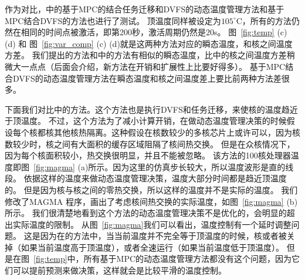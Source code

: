 作为对比，\cite{MaWang:APCCAS'14}中的基于MPC的结合任务迁移和DVFS的动态温度管理方法和基于MPC结合DVFS的方法也进行了测试。
顶温度同样被设定为$105^{\circ}$C，所有的方法仍然在相同的时间点被激活，即第200秒，激活周期仍然是$20$s。
图~\ref{fig:temp} (c) (d) 和 图~\ref{fig:var_comp} (c) (d)就是这两种方法对应的瞬态温度，和核之间温度方差。
我们提出的方法和\cite{MaWang:APCCAS'14}中的方法有相似的瞬态温度，比\cite{MaWang:APCCAS'14}中的核之间温度方差稍微大一点点（后面会介绍，新方法在开销和扩展性上比\cite{MaWang:APCCAS'14}要好得多）。
基于MPC结合DVFS的动态温度管理方法在瞬态温度和核之间温度差上要比前两种方法差很多。

下面我们对比\cite{Hanumaiah:TCAD'11}中的方法。这个方法也是执行DVFS和任务迁移，来使核的温度趋近于顶温度。
不过，这个方法为了减小计算开销，在做动态温度管理决策的时候假设每个核都核其他核热隔离。这种假设在核数较少的多核芯片上或许可以，因为核数较少时，核之间有大面积的缓存区域阻隔了核间热交换。
但是在众核情况下，因为每个核面积较小，热交换很明显，并且不能被忽略。
该方法的100核处理器温度即图~\ref{fig:magma} (a)所示。因为这里的仿真步长较大，所以温度波形是直的线段。
依据这样的温度来做动态温度管理决策，温度大部分时间都是趋近顶温度的。
但是因为核与核之间的零热交换，所以这样的温度并不是实际的温度。
我们修改了MAGMA 程序，画出了考虑核间热交换的实际温度，如图~\ref{fig:magma} (b)所示。
我们很清楚地看到这个方法的动态温度管理决策不是优化的，会明显的超出实际温度的限制。
从图~\ref{fig:magma}我们可以看出，温度控制有一个延时调整问题。
这是因为在\cite{Hanumaiah:TCAD'11}的方法中，当当前温度并不完全等于顶温度的时候，核或者被关掉（如果当前温度高于顶温度），或者全速运行（如果当前温度低于顶温度）。
但是在图~\ref{fig:temp}中，所有基于MPC的动态温度管理方法都没有这个问题，因为它们可以提前预测来做决策，这样就会是比较平滑的温度控制。

